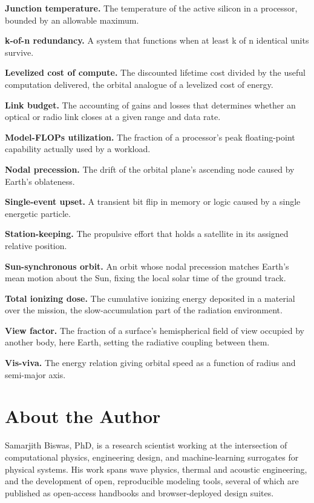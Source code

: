 \documentclass[
  11pt,
  openany,
  oneside]{book}
\begin{document}
\textbf{Junction temperature.} The temperature of the active silicon in
a processor, bounded by an allowable maximum.

\textbf{k-of-n redundancy.} A system that functions when at least k of n
identical units survive.

\textbf{Levelized cost of compute.} The discounted lifetime cost divided
by the useful computation delivered, the orbital analogue of a levelized
cost of energy.

\textbf{Link budget.} The accounting of gains and losses that determines
whether an optical or radio link closes at a given range and data rate.

\textbf{Model-FLOPs utilization.} The fraction of a processor's peak
floating-point capability actually used by a workload.

\textbf{Nodal precession.} The drift of the orbital plane's ascending
node caused by Earth's oblateness.

\textbf{Single-event upset.} A transient bit flip in memory or logic
caused by a single energetic particle.

\textbf{Station-keeping.} The propulsive effort that holds a satellite
in its assigned relative position.

\textbf{Sun-synchronous orbit.} An orbit whose nodal precession matches
Earth's mean motion about the Sun, fixing the local solar time of the
ground track.

\textbf{Total ionizing dose.} The cumulative ionizing energy deposited
in a material over the mission, the slow-accumulation part of the
radiation environment.

\textbf{View factor.} The fraction of a surface's hemispherical field of
view occupied by another body, here Earth, setting the radiative
coupling between them.

\textbf{Vis-viva.} The energy relation giving orbital speed as a
function of radius and semi-major axis.

\backmatter
\clearpage
\chapter*{About the Author}

\noindent Samarjith Biswas, PhD, is a research scientist working at the intersection of computational
physics, engineering design, and machine-learning surrogates for physical systems. His work spans
wave physics, thermal and acoustic engineering, and the development of open, reproducible modeling
tools, several of which are published as open-access handbooks and browser-deployed design suites.
\end{document}
